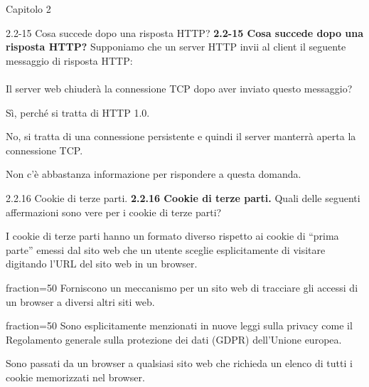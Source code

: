 \documentclass[a4paper]{article}
\begin{document}
\begin{quiz}{Capitolo 2}
\begin{multi}[points=1,shuffle]{2.2-15 Cosa succede dopo una risposta HTTP?}
\textbf{2.2-15 Cosa succede dopo una risposta HTTP?} 
Supponiamo che un server HTTP invii al client il seguente messaggio di risposta HTTP: \\

\\

Il server web chiuderà la connessione TCP dopo aver inviato questo messaggio?
\item* Sì, perché si tratta di HTTP 1.0.
\item No, si tratta di una connessione persistente e quindi il server manterrà aperta la connessione TCP.
\item Non c'è abbastanza informazione per rispondere a questa domanda.
\end{multi}
    
\begin{multi}[points=1,shuffle,multiple]{2.2.16 Cookie di terze parti.}
\textbf{2.2.16 Cookie di terze parti.} 
Quali delle seguenti affermazioni sono vere per i cookie di terze parti?

\item I cookie di terze parti hanno un formato diverso rispetto ai cookie di ``prima parte'' emessi dal sito web che un utente sceglie esplicitamente di visitare digitando l'URL del sito web in un browser.
\item[fraction=50] Forniscono un meccanismo per un sito web di tracciare gli accessi di un browser a diversi altri siti web.
\item[fraction=50] Sono esplicitamente menzionati in nuove leggi sulla privacy come il Regolamento generale sulla protezione dei dati (GDPR) dell'Unione europea.
\item Sono passati da un browser a qualsiasi sito web che richieda un elenco di tutti i cookie memorizzati nel browser.
\end{multi}


\end{quiz}
\end{document}
